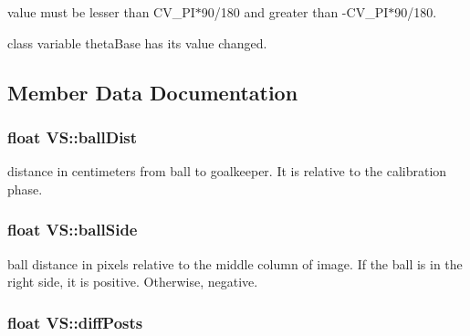 \begin{DoxyItemize}
\item value must be lesser than C\-V\-\_\-\-P\-I$\ast$90/180 and greater than -\/\-C\-V\-\_\-\-P\-I$\ast$90/180.
\item class variable theta\-Base has its value changed. 
\end{DoxyItemize}

\subsection{Member Data Documentation}
\hypertarget{classVS_a29dad6f6e4e8b8c046782b4c2cefa70e}{
\subsubsection[{ball\-Dist}]{\setlength{\rightskip}{0pt plus 5cm}float V\-S\-::ball\-Dist\hspace{0.3cm}{\ttfamily [private]}}}\label{classVS_a29dad6f6e4e8b8c046782b4c2cefa70e}


distance in centimeters from ball to goalkeeper. It is relative to the calibration phase. 

\hypertarget{classVS_a38b44df3e672879391fd65858bfac6ce}{
\subsubsection[{ball\-Side}]{\setlength{\rightskip}{0pt plus 5cm}float V\-S\-::ball\-Side\hspace{0.3cm}{\ttfamily [private]}}}\label{classVS_a38b44df3e672879391fd65858bfac6ce}


ball distance in pixels relative to the middle column of image. If the ball is in the right side, it is positive. Otherwise, negative. 

\hypertarget{classVS_ac744fb6e416a1d31e4385674712bb2ce}{
\subsubsection[{diff\-Posts}]{\setlength{\rightskip}{0pt plus 5cm}float V\-S\-::diff\-Posts\hspace{0.3cm}{\ttfamily [private]}}}\label{classVS_ac744fb6e416a1d31e4385674712bb2ce}


